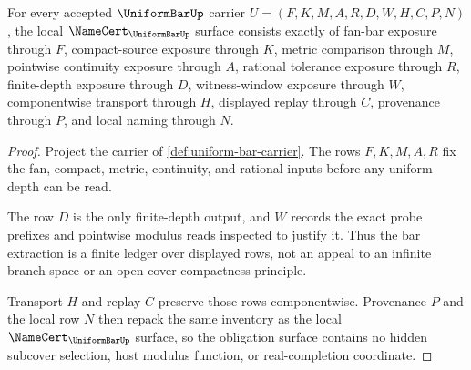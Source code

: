 \begin{theorem}
\label{thm:uniform-bar-namecert-obligations}
For every accepted $\UniformBarUp$ carrier $U=(F,K,M,A,R,D,W,H,C,P,N)$, the local $\NameCert_{\UniformBarUp}$ surface consists exactly of fan-bar exposure through $F$, compact-source exposure through $K$, metric comparison through $M$, pointwise continuity exposure through $A$, rational tolerance exposure through $R$, finite-depth exposure through $D$, witness-window exposure through $W$, componentwise transport through $H$, displayed replay through $C$, provenance through $P$, and local naming through $N$.
\end{theorem}
\begin{proof}
Project the carrier of \autoref{def:uniform-bar-carrier}. The rows $F,K,M,A,R$ fix the fan, compact, metric, continuity, and rational inputs before any uniform depth can be read.

The row $D$ is the only finite-depth output, and $W$ records the exact probe prefixes and pointwise modulus reads inspected to justify it. Thus the bar extraction is a finite ledger over displayed rows, not an appeal to an infinite branch space or an open-cover compactness principle.

Transport $H$ and replay $C$ preserve those rows componentwise. Provenance $P$ and the local row $N$ then repack the same inventory as the local $\NameCert_{\UniformBarUp}$ surface, so the obligation surface contains no hidden subcover selection, host modulus function, or real-completion coordinate.
\end{proof}

